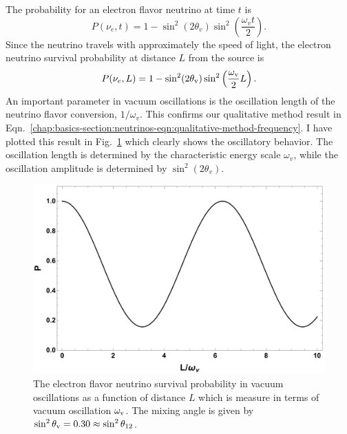 The probability for an electron flavor neutrino at time $t$ is
\begin{equation}
P(\nu_e,t) = 1-\sin^2(2\theta_v)\sin^2\left( \frac{\omega_v t}{2} \right).
\end{equation}
Since the neutrino travels with approximately the speed of light, the electron neutrino survival probability at distance $L$ from the source is
\begin{equation}
P(\nu_e,L) =  1-\sin^2(2\theta_\mathrm v)\sin^2\left( \frac{\omega_\mathrm v}{2} L \right).
\end{equation}
An important parameter in vacuum oscillations is the oscillation length of the neutrino flavor conversion, $1/\omega_v$. This confirms our qualitative method result in Eqn.~\ref{chap:basics-section:neutrinos-eqn:qualitative-method-frequency}. I have plotted this result in Fig.~\ref{chap:basics-section:neutrinos-fig:vacuum-2-flavor-osc} which clearly shows the oscillatory behavior. The oscillation length is determined by the characteristic energy scale $\omega_v$, while the oscillation amplitude is determined by $\sin^2(2\theta_v)$.

\begin{figure}
    \centering
    \includegraphics[width=\textwidth]{chapters/assets/basics/neutrino-vaccum-osc-2-flavor.pdf}
    \caption{The electron flavor neutrino survival probability in vacuum oscillations as a function of distance $L$ which is measure in terms of vacuum oscillation $\omega_\mathrm v$. The mixing angle is given by $\sin^2\theta_\mathrm v=0.30 \approx \sin^2 \theta_{12}$.}
    \label{chap:basics-section:neutrinos-fig:vacuum-2-flavor-osc}
\end{figure}



